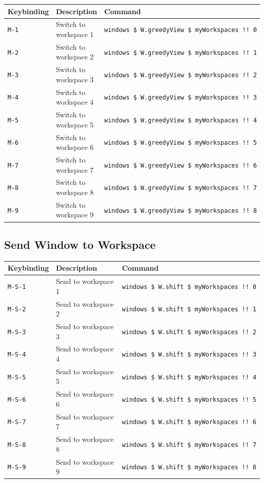 \begin{longtable}[]{@{}lll@{}}
\toprule
Keybinding & Description & Command \\
\midrule
\endhead
\texttt{M-1} & Switch to workspace 1 &
\texttt{windows\ \$\ W.greedyView\ \$\ myWorkspaces\ !!\ 0} \\
\texttt{M-2} & Switch to workspace 2 &
\texttt{windows\ \$\ W.greedyView\ \$\ myWorkspaces\ !!\ 1} \\
\texttt{M-3} & Switch to workspace 3 &
\texttt{windows\ \$\ W.greedyView\ \$\ myWorkspaces\ !!\ 2} \\
\texttt{M-4} & Switch to workspace 4 &
\texttt{windows\ \$\ W.greedyView\ \$\ myWorkspaces\ !!\ 3} \\
\texttt{M-5} & Switch to workspace 5 &
\texttt{windows\ \$\ W.greedyView\ \$\ myWorkspaces\ !!\ 4} \\
\texttt{M-6} & Switch to workspace 6 &
\texttt{windows\ \$\ W.greedyView\ \$\ myWorkspaces\ !!\ 5} \\
\texttt{M-7} & Switch to workspace 7 &
\texttt{windows\ \$\ W.greedyView\ \$\ myWorkspaces\ !!\ 6} \\
\texttt{M-8} & Switch to workspace 8 &
\texttt{windows\ \$\ W.greedyView\ \$\ myWorkspaces\ !!\ 7} \\
\texttt{M-9} & Switch to workspace 9 &
\texttt{windows\ \$\ W.greedyView\ \$\ myWorkspaces\ !!\ 8} \\
\bottomrule
\end{longtable}

\hypertarget{send-window-to-workspace}{%
\subsection{Send Window to Workspace}\label{send-window-to-workspace}}

\begin{longtable}[]{@{}lll@{}}
\toprule
Keybinding & Description & Command \\
\midrule
\endhead
\texttt{M-S-1} & Send to workspace 1 &
\texttt{windows\ \$\ W.shift\ \$\ myWorkspaces\ !!\ 0} \\
\texttt{M-S-2} & Send to workspace 2 &
\texttt{windows\ \$\ W.shift\ \$\ myWorkspaces\ !!\ 1} \\
\texttt{M-S-3} & Send to workspace 3 &
\texttt{windows\ \$\ W.shift\ \$\ myWorkspaces\ !!\ 2} \\
\texttt{M-S-4} & Send to workspace 4 &
\texttt{windows\ \$\ W.shift\ \$\ myWorkspaces\ !!\ 3} \\
\texttt{M-S-5} & Send to workspace 5 &
\texttt{windows\ \$\ W.shift\ \$\ myWorkspaces\ !!\ 4} \\
\texttt{M-S-6} & Send to workspace 6 &
\texttt{windows\ \$\ W.shift\ \$\ myWorkspaces\ !!\ 5} \\
\texttt{M-S-7} & Send to workspace 7 &
\texttt{windows\ \$\ W.shift\ \$\ myWorkspaces\ !!\ 6} \\
\texttt{M-S-8} & Send to workspace 8 &
\texttt{windows\ \$\ W.shift\ \$\ myWorkspaces\ !!\ 7} \\
\texttt{M-S-9} & Send to workspace 9 &
\texttt{windows\ \$\ W.shift\ \$\ myWorkspaces\ !!\ 8} \\
\bottomrule
\end{longtable}

